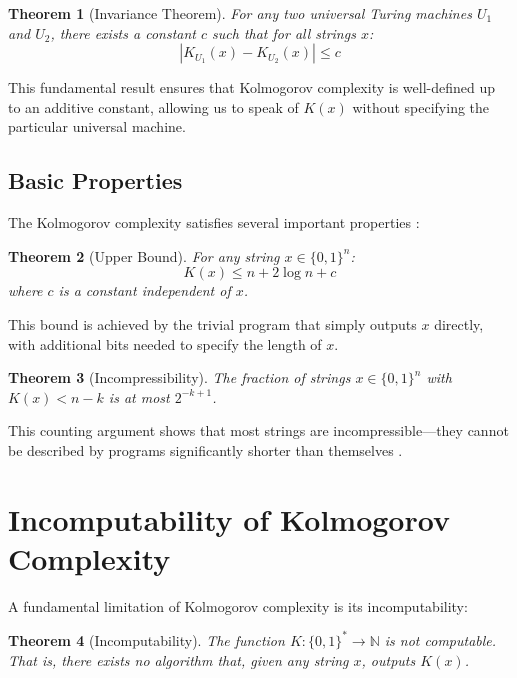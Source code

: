 \documentclass[12pt,a4paper]{report}
\newtheorem{theorem}{Theorem}[chapter]
\begin{document}
\begin{theorem}[Invariance Theorem]
For any two universal Turing machines $U_1$ and $U_2$, there exists a constant $c$ such that for all strings $x$:
\begin{equation}
|K_{U_1}(x) - K_{U_2}(x)| \leq c
\end{equation}
\end{theorem}

This fundamental result ensures that Kolmogorov complexity is well-defined up to an additive constant, allowing us to speak of $K(x)$ without specifying the particular universal machine.

\subsection{Basic Properties}

The Kolmogorov complexity satisfies several important properties \cite{li2008introduction}:

\begin{theorem}[Upper Bound]
For any string $x \in \{0,1\}^n$:
\begin{equation}
K(x) \leq n + 2\log n + c
\end{equation}
where $c$ is a constant independent of $x$.
\end{theorem}

This bound is achieved by the trivial program that simply outputs $x$ directly, with additional bits needed to specify the length of $x$.

\begin{theorem}[Incompressibility]
The fraction of strings $x \in \{0,1\}^n$ with $K(x) < n - k$ is at most $2^{-k+1}$.
\end{theorem}

This counting argument shows that most strings are incompressible—they cannot be described by programs significantly shorter than themselves \cite{cover2006elements}.


\section{Incomputability of Kolmogorov Complexity}

A fundamental limitation of Kolmogorov complexity is its incomputability:

\begin{theorem}[Incomputability]
The function $K: \{0,1\}^* \rightarrow \mathbb{N}$ is not computable. That is, there exists no algorithm that, given any string $x$, outputs $K(x)$.
\end{theorem}
\end{document}
